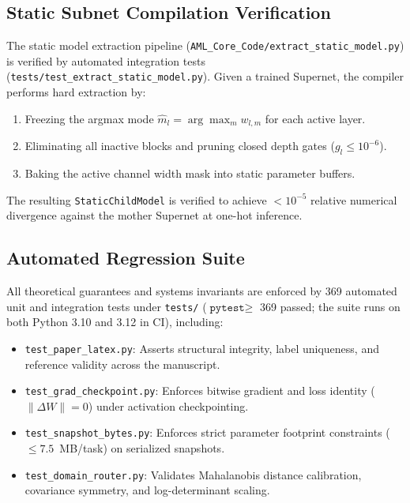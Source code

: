 \documentclass[11pt, a4paper]{article}
\begin{document}
\subsection{Static Subnet Compilation Verification}
The static model extraction pipeline (\texttt{AML\_Core\_Code/extract\_static\_model.py}) is verified by automated integration tests (\texttt{tests/test\_extract\_static\_model.py}). Given a trained Supernet, the compiler performs hard extraction by:
\begin{enumerate}\setlength{\itemsep}{1pt}\setlength{\parskip}{0pt}
    \item Freezing the argmax mode $\hat{m}_l = \arg\max_{m} w_{l, m}$ for each active layer.
    \item Eliminating all inactive blocks and pruning closed depth gates ($g_l \le 10^{-6}$).
    \item Baking the active channel width mask into static parameter buffers.
\end{enumerate}
The resulting \texttt{StaticChildModel} is verified to achieve $< 10^{-5}$ relative numerical divergence against the mother Supernet at one-hot inference.

\subsection{Automated Regression Suite}
All theoretical guarantees and systems invariants are enforced by 369 automated unit and integration tests under \texttt{tests/} ($\texttt{pytest} \geq$ 369 passed; the suite runs on both Python 3.10 and 3.12 in CI), including:
\begin{itemize}\setlength{\itemsep}{1pt}\setlength{\parskip}{0pt}
    \item \texttt{test\_paper\_latex.py}: Asserts structural integrity, label uniqueness, and reference validity across the manuscript.
    \item \texttt{test\_grad\_checkpoint.py}: Enforces bitwise gradient and loss identity ($\|\Delta W\| = 0$) under activation checkpointing.
    \item \texttt{test\_snapshot\_bytes.py}: Enforces strict parameter footprint constraints ($\le 7.5$~MB/task) on serialized snapshots.
    \item \texttt{test\_domain\_router.py}: Validates Mahalanobis distance calibration, covariance symmetry, and log-determinant scaling.
\end{itemize}
\end{document}
